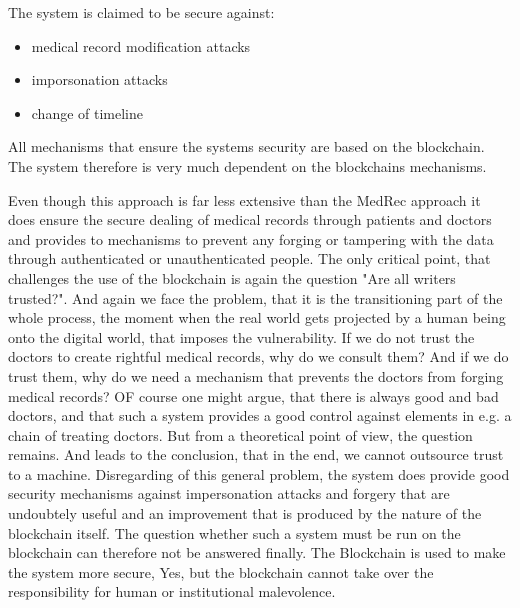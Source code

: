 The system is claimed to be secure against:
\begin{itemize}
	\item medical record modification attacks
	\item imporsonation attacks
	\item change of timeline
\end{itemize}
All mechanisms that ensure the systems security are based on the blockchain. The system therefore is very much dependent on the blockchains mechanisms.

Even though this approach is far less extensive than the MedRec approach it does ensure the secure dealing of medical records through patients and doctors and provides to mechanisms to prevent any forging or tampering with the data through authenticated or unauthenticated people.
The only critical point, that challenges the use of the blockchain is again the question "Are all writers trusted?"\cite{Wust2017}. And again we face the problem, that it is the transitioning part of the whole process, the moment when the real world gets projected by a human being onto the digital world, that imposes the vulnerability.
If we do not trust the doctors to create rightful medical records, why do we consult them? And if we do trust them, why do we need a mechanism that prevents the doctors from forging medical records?
OF course one might argue, that there is always good and bad doctors, and that such a system provides a good control against elements in e.g. a chain of treating doctors. But from a theoretical point of view, the question remains. And leads to the conclusion, that in the end, we cannot outsource trust to a machine. 
Disregarding of this general problem, the system does provide good security mechanisms against impersonation attacks and forgery that are undoubtely useful and an improvement that is produced by the nature of the blockchain itself.
The question whether such a system must be run on the blockchain can therefore not be answered finally. The Blockchain is used to make the system more secure, Yes, but the blockchain cannot take over the responsibility for human or institutional malevolence.



